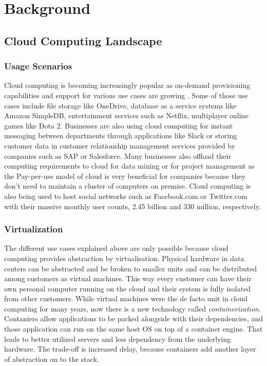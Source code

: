 
\chapter{Background}\label{chapter:background} %

\section{Cloud Computing Landscape} %
\subsection{Usage Scenarios}
Cloud computing is becoming increasingly popular as on-demand provisioning capabilities and support for various use cases are growing \cite{cloud-use-cases}. Some of those use cases include file storage like OneDrive, database as a service systems like Amazon SimpleDB, entertainment services such as Netflix, multiplayer online games like Dota 2. Businesses are also using cloud computing for instant messaging between departments through applications like Slack or storing customer data in customer relationship management services provided by companies such as SAP or Salesforce. Many businesses also offload their computing requirements to cloud for data mining or for project management as the Pay-per-use model of cloud is very beneficial for companies because they don't need to maintain a cluster of computers on premise. Cloud computing is also being used to host social networks such as Facebook.com or Twitter.com with their massive monthly user counts, 2.45 billion and 330 million, respectively.

\subsection{Virtualization}
The different use cases explained above are only possible because cloud computing provides abstraction by virtualisation. Physical hardware in data centers can be abstracted and be broken to smaller units and can be distributed among customers as virtual machines. This way every customer can have their own personal computer running on the cloud and their system is fully isolated from other customers. While virtual machines were the de facto unit in cloud computing for many years, now there is a new technology called \textit{containerization}. Contaniers allow applications to be packed alongside with their dependencies, and those application can run on the same host OS on top of a container engine. That leads to better utilized servers and less dependency from the underlying hardware. The trade-off is increased delay, because containers add another layer of abstraction on to the stack.

